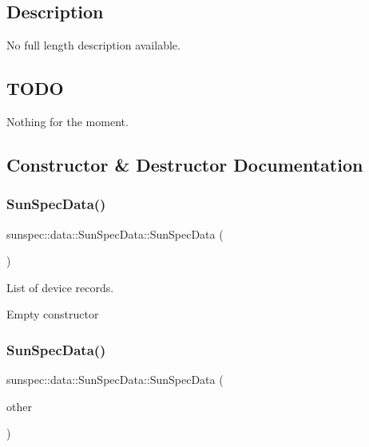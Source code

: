 \subsection*{Description}

No full length description available.

\subsection*{T\+O\+DO}

Nothing for the moment. 

\subsection{Constructor \& Destructor Documentation}
\mbox{\label{structsunspec_1_1data_1_1_sun_spec_data_a8ad742efc8d2f0b8eab04505e9849084}} 
\subsubsection{\texorpdfstring{Sun\+Spec\+Data()}{SunSpecData()}\hspace{0.1cm}{\footnotesize\ttfamily [1/3]}}
{\footnotesize\ttfamily sunspec\+::data\+::\+Sun\+Spec\+Data\+::\+Sun\+Spec\+Data (\begin{DoxyParamCaption}{ }\end{DoxyParamCaption})\hspace{0.3cm}{\ttfamily [default]}}



List of device records. 

Empty constructor \mbox{\label{structsunspec_1_1data_1_1_sun_spec_data_a712ee0978e396de352b28e5f6df7b681}} 
\subsubsection{\texorpdfstring{Sun\+Spec\+Data()}{SunSpecData()}\hspace{0.1cm}{\footnotesize\ttfamily [2/3]}}
{\footnotesize\ttfamily sunspec\+::data\+::\+Sun\+Spec\+Data\+::\+Sun\+Spec\+Data (\begin{DoxyParamCaption}\item[{const \hyperlink{structsunspec_1_1data_1_1_sun_spec_data}{Sun\+Spec\+Data} \&}]{other }\end{DoxyParamCaption})\hspace{0.3cm}{\ttfamily [default]}}

